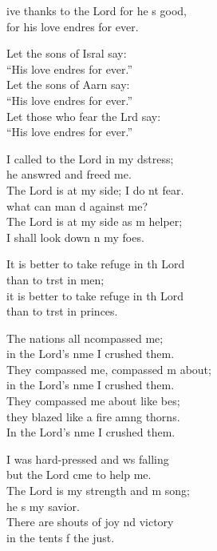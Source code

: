 \settowidth{\versewidth}{I shall not die, I shall live and recount his deeds.}
\begin{psalmverse}%
  \begin{patverse}
    ive thanks to the Lord for he \pointup{\i}s good,\Med\\
    for his love endres for ever.

    Let the sons of Isral say:\Med\\
    “His love endres for ever.”\\
    Let the sons of Aarn say:\Med\\
    “His love endres for ever.”\\
    Let those who fear the Lrd say:\Med\\
    “His love endres for ever.”

    I called to the Lord in my d\pointup{\i}stress;\Med\\
    he answred and freed me.\\
    The Lord is at my side; I do nt fear.\Med\\
    what can man d against me?\\
    The Lord is at my side as m helper;\Med\\
    I shall look down n my foes.

    It is better to take refuge in th Lord\Med\\
    than to trst in men;\\
    it is better to take refuge in th Lord\Med\\
    than to trst in princes.

    The nations all ncompassed me;\Med\\
    in the Lord’s nme I crushed them.\\
    They compassed me, compassed m about;\Med\\
    in the Lord’s nme I crushed them.\\
    They compassed me about like bes;\Flex\\
    they blazed like a fire amng thorns.\Med\\
    In the Lord’s nme I crushed them.

    I was hard-pressed and ws falling\Med\\
    but the Lord cme to help me.\\
    The Lord is my strength and m song;\Med\\
    he \pointup{\i}s my savior.\\
    There are shouts of joy nd victory\Med\\
    in the tents f the just.


\end{patverse}
\end{psalmverse}
